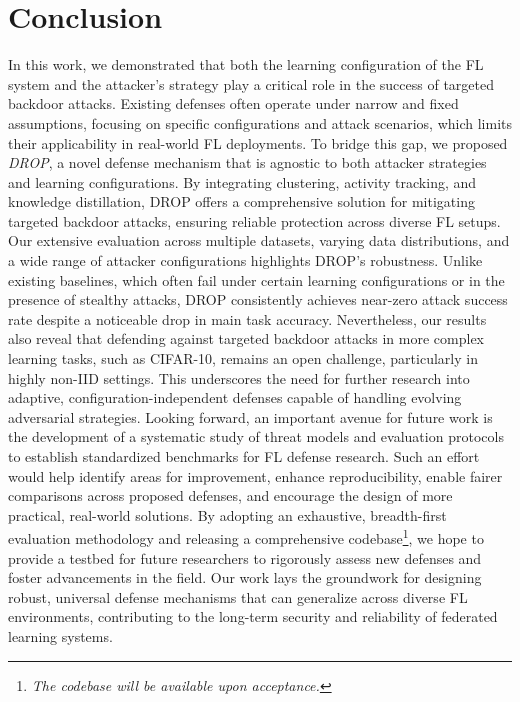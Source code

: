 \section{Conclusion}
\label{sec:conclusion}

In this work, we demonstrated that both the learning configuration of the FL system and the attacker’s strategy play a critical role in the success of targeted backdoor attacks. Existing defenses often operate under narrow and fixed assumptions, focusing on specific configurations and attack scenarios, which limits their applicability in real-world FL deployments. To bridge this gap, we proposed \textit{DROP}, a novel defense mechanism that is agnostic to both attacker strategies and learning configurations. By integrating clustering, activity tracking, and knowledge distillation, DROP offers a comprehensive solution for mitigating targeted backdoor attacks, ensuring reliable protection across diverse FL setups. Our extensive evaluation across multiple datasets, varying data distributions, and a wide range of attacker configurations highlights DROP’s robustness. Unlike existing baselines, which often fail under certain learning configurations or in the presence of stealthy attacks, DROP consistently achieves near-zero attack success rate despite a noticeable drop in main task accuracy. Nevertheless, our results also reveal that defending against targeted backdoor attacks in more complex learning tasks, such as CIFAR-10, remains an open challenge, particularly in highly non-IID settings. This underscores the need for further research into adaptive, configuration-independent defenses capable of handling evolving adversarial strategies. Looking forward, an important avenue for future work is the development of a systematic study of threat models and evaluation protocols to establish standardized benchmarks for FL defense research. Such an effort would help identify areas for improvement, enhance reproducibility, enable fairer comparisons across proposed defenses, and encourage the design of more practical, real-world solutions. By adopting an exhaustive, breadth-first evaluation methodology and releasing a comprehensive codebase\footnote{\textit{The codebase will be available upon acceptance.}}, we hope to provide a testbed for future researchers to rigorously assess new defenses and foster advancements in the field. Our work lays the groundwork for designing robust, universal defense mechanisms that can generalize across diverse FL environments, contributing to the long-term security and reliability of federated learning systems.
